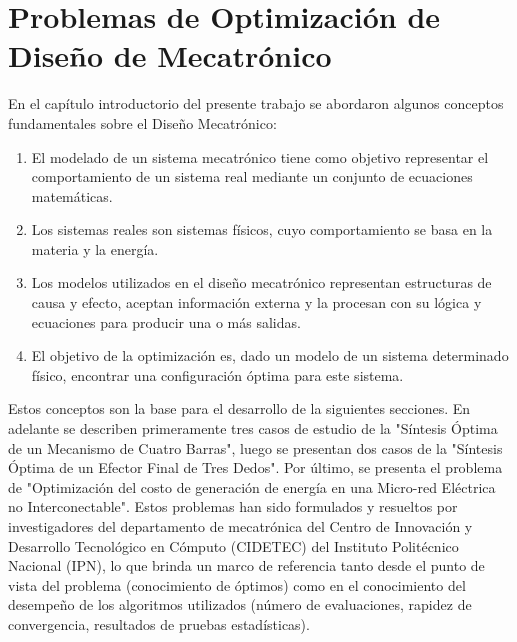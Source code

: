 \chapter{Problemas de Optimización de Diseño de Mecatrónico} 
\label{Chapter5} 
En el capítulo introductorio del presente trabajo se abordaron algunos conceptos fundamentales sobre el Diseño Mecatrónico:
\begin{enumerate}
\item El modelado de un sistema mecatrónico tiene como objetivo representar el comportamiento de un sistema real mediante un conjunto de ecuaciones matemáticas.
\item Los sistemas reales son sistemas físicos, cuyo comportamiento se basa en la materia y la energía.
\item   Los modelos utilizados en el diseño mecatrónico representan estructuras de causa y efecto, aceptan información externa y la procesan con su lógica y ecuaciones para producir una o más salidas. 
\item El objetivo de la optimización es, dado un modelo de un sistema determinado físico, encontrar una configuración óptima para este sistema. 
\end{enumerate}
Estos conceptos son la base para el desarrollo de la siguientes secciones. En adelante se describen primeramente tres casos de estudio de la "Síntesis Óptima de un Mecanismo de Cuatro Barras", luego se presentan dos casos de la "{Síntesis Óptima de un Efector Final de Tres Dedos}". Por último, se presenta el problema de "{Optimización del costo de generación de energía en una Micro-red Eléctrica no Interconectable}". Estos problemas han sido formulados y resueltos por investigadores del departamento de mecatrónica del Centro de Innovación y Desarrollo Tecnológico en Cómputo (CIDETEC) del Instituto Politécnico Nacional (IPN), lo que brinda un marco de referencia tanto desde el punto de vista del problema (conocimiento de óptimos) como en el conocimiento del desempeño de los algoritmos utilizados (número de evaluaciones, rapidez de convergencia, resultados de pruebas estadísticas).
